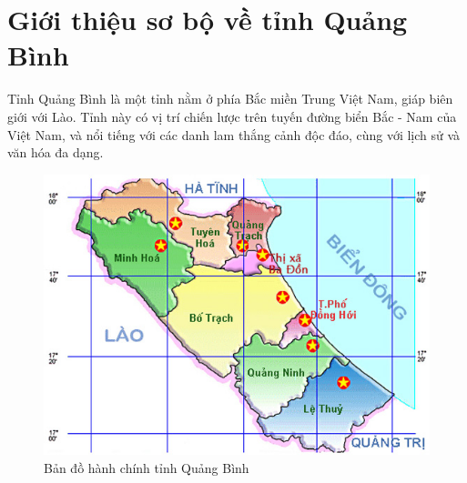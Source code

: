 \documentclass[12pt]{report}
\begin{document}
\section*{Giới thiệu sơ bộ về tỉnh Quảng Bình}
\begin{flushleft}
	Tỉnh Quảng Bình là một tỉnh nằm ở phía Bắc miền Trung Việt Nam, giáp biên giới với Lào. Tỉnh này có vị trí chiến lược trên tuyến đường biển Bắc - Nam của Việt Nam, và nổi tiếng với các danh lam thắng cảnh độc đáo, cùng với lịch sử và văn hóa đa dạng.
	\\[\baselineskip]

	\begin{figure}[H]
		\centering
		\includegraphics[width = \textwidth]{images/BandoQB.png}
		\caption{Bản đồ hành chính tỉnh Quảng Bình}
	\end{figure}
\end{flushleft}

\newpage
\end{document}
